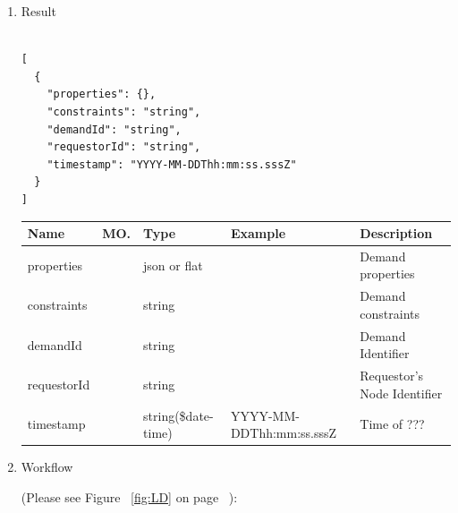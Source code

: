 \begin{enumerate}
\item Result

\begin{tcolorbox}[boxrule=0pt, frame empty]
\begin{verbatim}

[
  {
    "properties": {},
    "constraints": "string",
    "demandId": "string",
    "requestorId": "string",
    "timestamp": "YYYY-MM-DDThh:mm:ss.sssZ"
  }
]

\end{verbatim}
\end{tcolorbox}

\begin{center}
\begin{tabular}{|p{3cm}|l|p{3cm}|p{3cm}|p{4cm}|} 
\hline
\rowcolor{lightgray}	Name	& MO.	& Type	& Example & 	Description \\
\hline

properties	& 	& 	json or flat	&		&	Demand properties \\ 

\hline

constraints	& 	& 	string	&		&	Demand constraints \\ 

\hline

demandId		&	&	string	&		& 	Demand Identifier \\

\hline

requestorId  & 	&	string	&		&	Requestor's Node Identifier \\

\hline

timestamp	&	& 	string(\$date-time)	& YYYY-MM-DDThh:mm:ss.sssZ	&	Time of ???  \\ 

\hline

\end{tabular}
\end{center}


\item Workflow

(Please see Figure ~\ref{fig:LD} on page ~\pageref{fig:LD}):


\end{enumerate}

